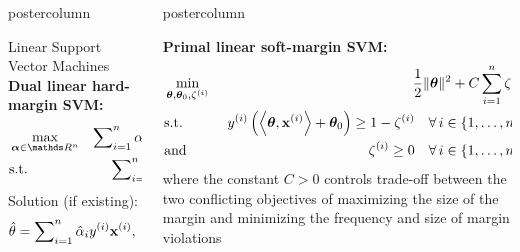 \documentclass{beamer}
\newlength{\columnheight} %
\begin{document}
\begin{frame}[fragile]{}
\begin{columns}
\begin{column}{.31\textwidth}
\begin{beamercolorbox}[center]{postercolumn}
\begin{minipage}{.98\textwidth}
{\begin{myblock}{Linear Support Vector Machines}
								\textbf{Dual linear hard-margin SVM:}
								\begin{eqnarray*}
									& \max\limits_{\alphav \in \R^n} & \sum\nolimits_{i=1}^n \alpha_i - \frac{1}{2}\sum\nolimits_{i=1}^n\sum\nolimits_{j=1}^n\alpha_i\alpha_j\yi y^{(j)} \scp{\xi}{\xv^{(j)}} \\
									& \text{s.t.} & \sum\nolimits_{i=1}^n \alpha_i \yi = 0, 
									\quad \text{and} \quad \alpha_i \ge 0~\forall i \in \nset
								\end{eqnarray*}
								Solution (if existing):
								$$
								\hat{\theta} = \sum\nolimits_{i=1}^n \hat \alpha_i y^{(i)} \mathbf{x}^{(i)}, \quad \theta_0 = y^{(i)} - \left\langle \bm{\theta}, \mathbf{x}^{(i)} \right\rangle.
								$$
							\end{myblock}
						}
					\end{minipage}
				\end{beamercolorbox}
			\end{column}
			\begin{column}{.31\textwidth}
				\begin{beamercolorbox}[center]{postercolumn}
					\begin{minipage}{.98\textwidth}
						\parbox[t][\columnheight]{\textwidth}{
						\begin{myblock}{} \vspace{-4ex}
							\textbf{Primal linear soft-margin SVM:} 	
							\begin{eqnarray*}
								& \min\limits_{\bm{\theta}, \bm{\theta}_0,\zeta^{(i)}} & \frac{1}{2} \|\bm{\theta}\|^2 + C   \sum_{i=1}^n \zeta^{(i)} \\
								& \text{s.t.} & \,\, y^{(i)}  \left( \left\langle \bm{\theta}, \mathbf{x}^{(i)} \right\rangle + \bm{\theta}_0 \right) \geq 1 - \zeta^{(i)} \quad \forall\, i \in \{1, \ldots, n\},\\
								& \text{and} & \,\, \zeta^{(i)} \geq 0 \quad \forall\, i \in \{1, \ldots, n\},\\
							\end{eqnarray*}
							where the constant $C > 0$ controls trade-off between the two conflicting
							objectives of maximizing the size of the margin and minimizing the
							frequency and size of margin violations\\
							

\end{myblock}}
\end{minipage}
\end{beamercolorbox}
\end{column}
\end{columns}
\end{frame}
\end{document}

